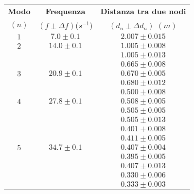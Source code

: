 \documentclass[12pt, a4paper]{article}
\begin{document}
\newpage
\begin{table}[!htb]
\centering
\begin{tabular}{|c|c|c|}
\hline
    \textbf{Modo} & \textbf{Frequenza} & \textbf{Distanza tra due nodi} \\ 
    \footnotesize$(n)$ & \footnotesize$(f\pm\Delta f)$($s^{-1}$) & \footnotesize$(d_n\pm\Delta d_n)$ $(m)$ \\ 
    \hline\hline
    \footnotesize$1$ & \footnotesize$7.0\pm0.1$ & \footnotesize$2.007 \pm 0.015$ \\[0.7ex] 
    \hline %
    \footnotesize$2$ & \footnotesize$14.0 \pm 0.1 $ &  \footnotesize$1.005 \pm 0.008$ \\[0.7ex]
    \footnotesize & \footnotesize & \footnotesize$1.005 \pm 0.013$ \\[0.7ex]
    \hline
    \footnotesize & \footnotesize & \footnotesize$0.665 \pm 0.008$ \\ [0.7ex]
    \footnotesize$3$ & \footnotesize$20.9 \pm 0.1$ & \footnotesize$0.670 \pm 0.005$  \\ [0.7ex]
    \footnotesize & \footnotesize & \footnotesize$0.680 \pm 0.012$ \\ [0.7ex]
    \hline 
    \footnotesize & \footnotesize & \footnotesize$0.500 \pm 0.008$ \\ [0.7ex]
    \footnotesize$4$ & \footnotesize$27.8 \pm 0.1$ & \footnotesize$0.508 \pm 0.005$ \\ [0.7ex]
    \footnotesize & \footnotesize & \footnotesize$0.505 \pm 0.005$ \\ [0.7ex]
    \footnotesize & \footnotesize & \footnotesize$0.505 \pm 0.013$ \\ [0.7ex]
    \hline
    \footnotesize & \footnotesize & \footnotesize$0.401 \pm 0.008$ \\ [0.7ex]
    \footnotesize & \footnotesize & \footnotesize$0.411 \pm 0.005$ \\ [0.7ex]
    \footnotesize$5$ & \footnotesize$34.7 \pm 0.1$ & \footnotesize$0.407 \pm 0.004$ \\ [0.7ex]
    \footnotesize & \footnotesize & \footnotesize$0.395 \pm 0.005$ \\ [0.7ex]
    \footnotesize & \footnotesize & \footnotesize$0.407 \pm 0.013$ \\ [0.7ex]
    \hline
    \footnotesize & \footnotesize & \footnotesize$0.330 \pm 0.006$ \\ [0.7ex]
    \footnotesize & \footnotesize & \footnotesize$0.333 \pm 0.003$ \\ [0.7ex]

\end{tabular}
\end{table}
\end{document}
